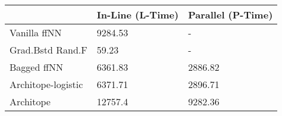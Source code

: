 \begin{tabular}{lll}
\toprule
{} & In-Line (L-Time) & Parallel (P-Time) \\
\midrule
Vanilla ffNN       &          9284.53 &                 - \\
Grad.Bstd Rand.F   &            59.23 &                 - \\
Bagged ffNN        &          6361.83 &           2886.82 \\
Architope-logistic &          6371.71 &           2896.71 \\
Architope          &          12757.4 &           9282.36 \\
\bottomrule
\end{tabular}
